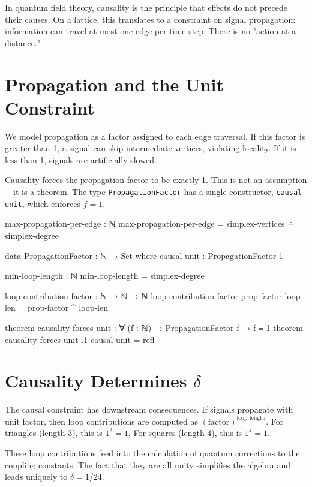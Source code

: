 \documentclass[11pt,a4paper]{book}
\begin{document}
In quantum field theory, causality is the principle that effects do not precede their causes. 
On a lattice, this translates to a constraint on signal propagation: information can travel 
at most one edge per time step. There is no "action at a distance."

\section{Propagation and the Unit Constraint}

We model propagation as a factor assigned to each edge traversal. If this factor is greater 
than 1, a signal can skip intermediate vertices, violating locality. If it is less than 1, 
signals are artificially slowed.

Causality forces the propagation factor to be exactly 1. This is not an assumption—it is a 
theorem. The type \texttt{PropagationFactor} has a single constructor, \texttt{causal-unit}, 
which enforces $f = 1$.

\begin{code}
max-propagation-per-edge : ℕ
max-propagation-per-edge = simplex-vertices ∸ simplex-degree

data PropagationFactor : ℕ → Set where
  causal-unit : PropagationFactor 1

min-loop-length : ℕ
min-loop-length = simplex-degree

loop-contribution-factor : ℕ → ℕ → ℕ
loop-contribution-factor prop-factor loop-len = prop-factor ^ loop-len

theorem-causality-forces-unit : ∀ (f : ℕ) → 
  PropagationFactor f → f ≡ 1
theorem-causality-forces-unit .1 causal-unit = refl
\end{code}

\section{Causality Determines \texorpdfstring{$\delta$}{delta}}

The causal constraint has downstream consequences. If signals propagate with unit factor, 
then loop contributions are computed as $(\text{factor})^{\text{loop length}}$. For triangles 
(length 3), this is $1^3 = 1$. For squares (length 4), this is $1^4 = 1$.

These loop contributions feed into the calculation of quantum corrections to the coupling 
constants. The fact that they are all unity simplifies the algebra and leads uniquely to 
$\delta = 1/24$.
\end{document}
